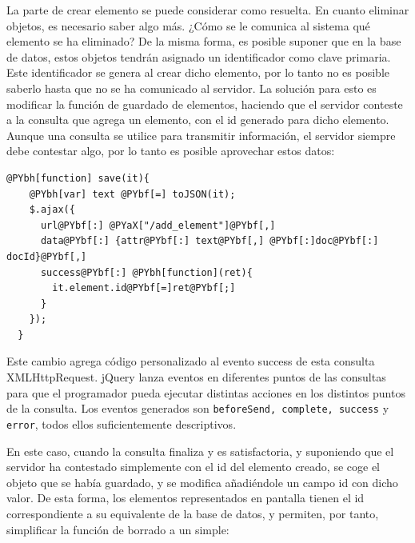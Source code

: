 
La parte de crear elemento se puede considerar como resuelta. En cuanto eliminar objetos, es necesario saber algo más. ¿Cómo se le comunica al sistema qué elemento se ha eliminado? De la misma forma, es posible suponer que en la base de datos, estos objetos tendrán asignado un identificador como clave primaria. Este identificador se genera al crear dicho elemento, por lo tanto no es posible saberlo hasta que no se ha comunicado al servidor. La solución para esto es modificar la función de guardado de elementos, haciendo que el servidor conteste a la consulta que agrega un elemento, con el id generado para dicho elemento. Aunque una consulta se utilice para transmitir información, el servidor siempre debe contestar algo, por lo tanto es posible aprovechar estos datos:

\begin{Verbatim}[commandchars=@\[\]]
  @PYbh[function] save(it){
  	@PYbh[var] text @PYbf[=] toJSON(it);
  	$.ajax({
  	  url@PYbf[:] @PYaX["/add_element"]@PYbf[,]
  	  data@PYbf[:] {attr@PYbf[:] text@PYbf[,] @PYbf[:]doc@PYbf[:] docId}@PYbf[,]
  	  success@PYbf[:] @PYbh[function](ret){
  	    it.element.id@PYbf[=]ret@PYbf[;]
  	  }
  	});
  }
\end{Verbatim}


Este cambio agrega código personalizado al evento success de esta consulta XMLHttpRequest. jQuery lanza eventos en diferentes puntos de las consultas para que el programador pueda ejecutar distintas acciones en los distintos puntos de la consulta. Los eventos generados son \texttt{beforeSend, complete, success} y \texttt{error}, todos ellos suficientemente descriptivos.

En este caso, cuando la consulta finaliza y es satisfactoria, y suponiendo que el servidor ha contestado simplemente con el id del elemento creado, se coge el objeto que se había guardado, y se modifica añadiéndole un campo id con dicho valor. De esta forma, los elementos representados en pantalla tienen el id correspondiente a su equivalente de la base de datos, y permiten, por tanto, simplificar la función de borrado a un simple:

